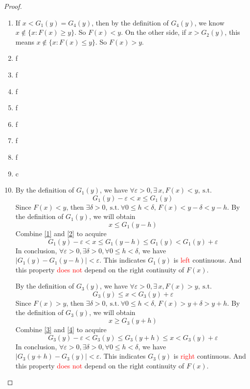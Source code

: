 \documentclass[11pt]{article}
\renewcommand{\(}{\left(}%
\renewcommand{\)}{\right)}%
\renewcommand{\[}{\left[}%
\renewcommand{\]}{\right]}%
\newcommand{\st}{\mathrm{\ s.t.\ }}
\newtheorem{proof}{Proof.}}
\begin{document}
\begin{proof}
\begin{enumerate}[\itshape (1)]
    This contradicts the fact $F(G_1(y))\geq y$ in {\itshape(4)}.
    \item If $x<G_1(y)=G_4(y)$, then by the definition of $G_4(y)$, we know $x\notin\{x:F(x)\geq y\}$. So $F(x)<y$. On the other side, if $x>G_2(y)$, this means $x\notin\{x:F(x)\leq y\}$. So $F(x)>y$.
    \item f
    \item f
    \item f
    \item f
    \item f
    \item f
    \item f
    \item c 
    \item By the definition of $G_1(y)$, we have $\forall\varepsilon>0,\exists\, x,F(x)<y,\st$
   \begin{equation}\label{1}
    G_1(y)-\varepsilon<x\leq G_1(y)
   \end{equation}
   Since $F(x)<y$, then $\exists\delta>0,\st\forall 0\leq h<\delta ,\, F(x)<y-\delta<  y-h$. By the definition of $G_1(y)$, we will obtain
   \begin{equation}\label{2}
    x\leq G_1(y-h )
   \end{equation}
   Combine \eqref{1} and \eqref{2} to acquire
   \begin{equation*}
    G_1(y)-\varepsilon<x\leq G_1(y-h )\leq G_1(y)<G_1(y)+\varepsilon
   \end{equation*}
   In conclusion, $\forall\varepsilon>0,\exists\delta>0,\forall 0\leq h<\delta$, we have $|G_1(y)-G_1(y-h)|<\varepsilon$. This indicates $G_1(y)$ is \textcolor{red}{left} continuous. And this property \textcolor{red}{ does not} depend on the right continuity of $F(x)$.
   
   By the definition of $G_3(y)$, we have $\forall\varepsilon>0,\exists\, x,F(x)>y,\st$
   \begin{equation}\label{3}
    G_3(y)\leq x< G_3(y)+\varepsilon
   \end{equation}
   Since $F(x)>y$, then $\exists\delta>0,\st\forall 0\leq h<\delta ,\, F(x)>y+\delta>y+h$. By the definition of $G_3(y)$, we will obtain
   \begin{equation}\label{4}
    x\geq G_3(y+h )
   \end{equation}
   Combine \eqref{3} and \eqref{4} to acquire
   \begin{equation*}
   G_3(y)-\varepsilon <G_3(y)\leq G_3(y+h )\leq  x< G_3(y)+\varepsilon
   \end{equation*}
   In conclusion, $\forall\varepsilon>0,\exists\delta>0,\forall 0\leq h<\delta$, we have $|G_3(y+h)-G_3(y)|<\varepsilon$. This indicates $G_3(y)$ is \textcolor{red}{right} continuous. And this property \textcolor{red}{ does not} depend on the right continuity of $F(x)$.


\end{enumerate}
\end{proof}
\end{document}
